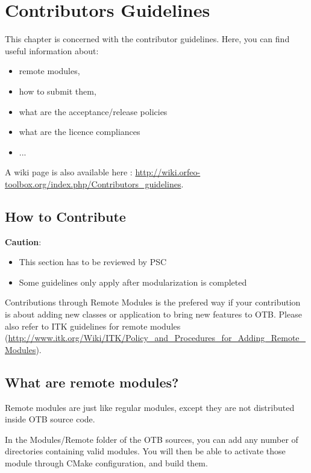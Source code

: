 \chapter{Contributors Guidelines}
\label{chapter:Contribute}

This chapter is concerned with the contributor guidelines.
Here, you can find useful information about:
\begin{itemize}
       \item remote modules, 
       \item how to submit them,
       \item what are the acceptance/release policies
       \item what are the licence compliances
       \item ...
\end{itemize}

A wiki page is also available here : \url{http://wiki.orfeo-toolbox.org/index.php/Contributors_guidelines}.

\section{How to Contribute}

\textbf{Caution}: 
\begin{itemize}
       \item  This section has to be reviewed by PSC
       \item  Some guidelines only apply after modularization is completed 
\end{itemize}

Contributions through Remote Modules is the prefered way if your contribution is about adding new classes or application to bring new features to OTB. 
Please also refer to ITK guidelines for remote modules (\url{http://www.itk.org/Wiki/ITK/Policy_and_Procedures_for_Adding_Remote_Modules}).

\section{What are remote modules?}

Remote modules are just like regular modules, except they are not distributed inside OTB source code.

In the Modules/Remote folder of the OTB sources, you can add any number of directories containing valid modules. You will then be able to activate those module through CMake configuration, and build them.


